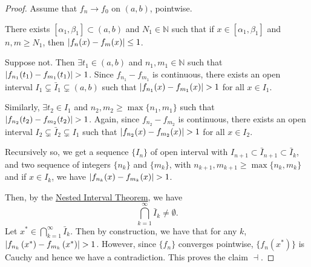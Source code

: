 \documentclass[notoc,notitlepage]{tufte-book}
\begin{document}
\begin{proof}
  Assume that $f_n \to f_0$ on $(a, b)$, pointwise.

  \noindent
   There exists $[ \alpha_1, \beta_1 ] \subset (a, b)$ and $N_1 \in \mathbb{N}$ such that if $x \in [\alpha_1, \beta_1]$ and $n, m \geq N_1$, then $\left| f_n(x) - f_m(x) \right| \leq 1$.

  \noindent
  Suppose not. Then $\exists t_1 \in (a, b)$ and $n_1, m_1 \in \mathbb{N}$ such that \\
  \noindent
  $\left| f_{n_1}(t_1) - f_{m_1}(t_1) \right| > 1$. Since $f_{n_1} - f_{m_1}$ is continuous, there exists an open interval $I_1 \subsetneq \bar{I}_1 \subsetneq (a, b)$ such that $\left| f_{n_1}(x) - f_{m_1}(x) \right| > 1$ for all $x \in I_1$.

  Similarly, $\exists t_2 \in I_1$ and $n_2, m_2 \geq \max \{ n_1, m_1 \}$ such that \\
  \noindent
  $\left| f_{n_2}(t_2) - f_{m_2}(t_2) \right| > 1$. Again, since $f_{n_2} - f_{m_2}$ is continuous, there exists an open interval $I_2 \subsetneq \bar{I}_2 \subsetneq I_1$ such that $\left| f_{n_2}(x) - f_{m_2}(x) \right| > 1$ for all $x \in I_2$.

  Recursively so, we get a sequence $\{ I_n \}$ of open interval with $I_{n + 1} \subset \bar{I}_{n + 1} \subset \bar{I}_k$, and two sequence of integers $\{ n_k \}$ and $\{ m_k \}$, with $n_{k + 1}, m_{k + 1} \geq \max \{ n_k, m_k \}$ and if $x \in I_k$, we have $\left| f_{n_k}(x) - f_{m_k}(x) \right| > 1$.

  Then, by the \hyperref[thm:nested_interval_theorem]{Nested Interval Theorem}, we have
  \begin{equation*}
    \bigcap_{k=1}^{\infty} \bar{I}_k \neq \emptyset.
  \end{equation*}
  Let $x^* \in \bigcap_{k=1}^{\infty} \bar{I}_k$. Then by construction, we have that for any $k$, $\left| f_{n_k}\left(x^*\right) - f_{m_k} \left( x^* \right) \right| > 1$. However, since $\{ f_n \}$ converges pointwise, $\{ f_n \left( x^* \right) \}$ is Cauchy and hence we have a contradiction. This proves the claim $\dashv$.


\end{proof}
\end{document}
